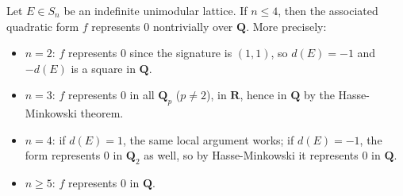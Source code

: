 Let $E \in S_n$ be an indefinite unimodular lattice. If $n \leq 4$, then the associated quadratic form $f$ represents $0$ nontrivially over $\mathbf{Q}$. More precisely:
\begin{itemize}
\item[(i)] $n = 2$: $f$ represents $0$ since the signature is $(1,1)$, so $d(E) = -1$ and $-d(E)$ is a square in $\mathbf{Q}$.
\item[(ii)] $n = 3$: $f$ represents $0$ in all $\mathbf{Q}_p$ ($p \neq 2$), in $\mathbf{R}$, hence in $\mathbf{Q}$ by the Hasse-Minkowski theorem.
\item[(iii)] $n = 4$: if $d(E) = 1$, the same local argument works; if $d(E) = -1$, the form represents $0$ in $\mathbf{Q}_2$ as well, so by Hasse-Minkowski it represents $0$ in $\mathbf{Q}$.
\item[(iv)] $n \geq 5$: $f$ represents $0$ in $\mathbf{Q}$.
\end{itemize}

